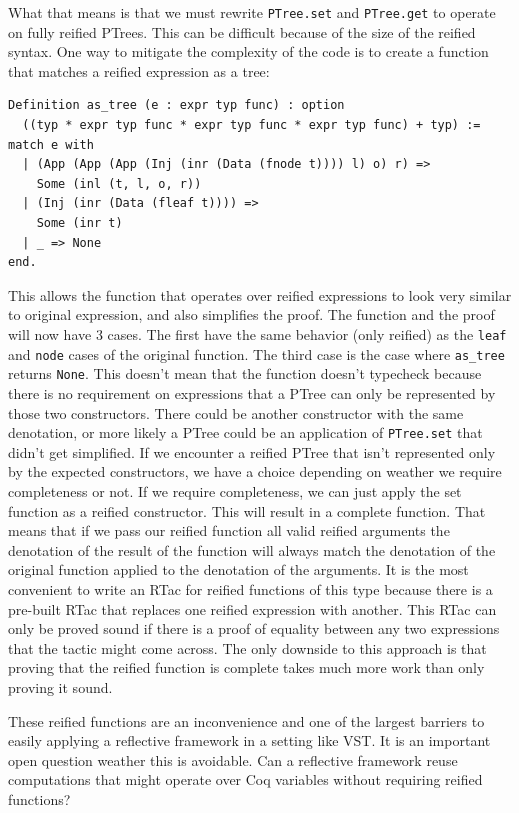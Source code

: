 \documentclass{puthesis}
\begin{document}
What that means is that we must rewrite \lstinline|PTree.set| and
\lstinline|PTree.get| to operate on fully reified PTrees. This can be
difficult because of the size of the reified syntax. One way to
mitigate the complexity of the code is to create a function that
matches a reified expression as a tree:

\begin{verbatim}
Definition as_tree (e : expr typ func) : option
  ((typ * expr typ func * expr typ func * expr typ func) + typ) := 
match e with
  | (App (App (App (Inj (inr (Data (fnode t)))) l) o) r) =>
    Some (inl (t, l, o, r))
  | (Inj (inr (Data (fleaf t)))) =>
    Some (inr t)
  | _ => None
end.
\end{verbatim}

This allows the function that operates over reified expressions to look very
similar to original expression, and also simplifies the proof. The function
and the proof will now have 3 cases. The first have the same behavior (only reified)
as the \lstinline|leaf| and \lstinline|node| cases of the original function. The third
case is the case where \lstinline|as_tree| returns \lstinline|None|. This doesn't
mean that the function doesn't typecheck because there is no requirement on 
expressions that a PTree can only be represented by those two constructors. There
could be another constructor with the same denotation, or more likely a PTree
could be an application of \lstinline|PTree.set| that didn't get simplified.
If we encounter a reified PTree that isn't represented
only by the expected constructors, we have a choice depending on
weather we require completeness or not. If we require completeness,
we can just apply the set function as a reified constructor. This
will result in a complete function. That means that if we
pass our reified function all valid reified arguments
the denotation of the result of the function will always
match the denotation of the original function applied
to the denotation of the arguments. It is the most convenient
to write an RTac for reified functions of this type because
there is a pre-built RTac that replaces one reified expression
with another. This RTac can only be proved sound if there is a proof
of equality between any two expressions that the tactic might come
across. The only downside to this approach is that proving that the
reified function is complete takes much more work than only proving it
sound. 

These reified functions are an inconvenience and one of the largest
barriers to easily applying a reflective framework in a setting like
VST. It is an important open question weather this is avoidable. Can
a reflective framework reuse computations that might operate
over Coq variables without requiring reified functions? 
\end{document}
